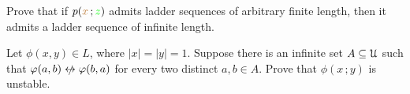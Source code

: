 
\begin{exercise}
  Prove that if $p({\color{brown} x}\,;{\color{green} z})$ admits ladder sequences of arbitrary finite length, then it admits a ladder sequence of infinite length.
\end{exercise}

\begin{exercise}
  Let $\phi(x,y)\in  L$, where $|x|=|y|=1$.
  Suppose there is an infinite set $A\subseteq\EuScript U$ such that $\phi(a,b)\niff\phi(b,a)$ for every two distinct $a,b\in A$.
  Prove that $\phi(x\,;y)$ is unstable.
\end{exercise}


  
  
  
